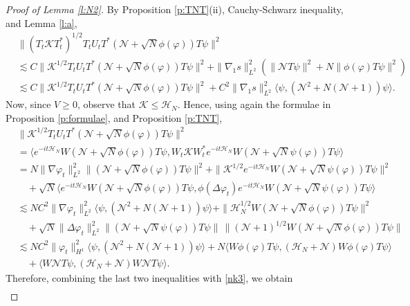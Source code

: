 \documentclass[11pt,a4paper]{scrartcl}
\newcommand{\N}{\mathcal{N}}
\newcommand{\K}{\mathcal{K}}
\begin{document}
\begin{proof}[Proof of Lemma \ref{l:N2}]
  
  By Proposition \ref{p:TNT}(ii), Cauchy-Schwarz inequality, and Lemma
  \ref{l:a},
  \begin{align*}
    & \| (T_t \K T_t^*)^{1/2} T_t U_t T^* ( \N + \sqrt{N} \phi(\varphi) ) T
    \psi \|^2 \\
    & \apprle C \| \K^{1/2} T_t U_t T^* ( \N + \sqrt{N} \phi(\varphi) ) T \psi
    \|^2 + \| \nabla_1 s \|_{L^2}^2 ( \| \N T \psi \|^2 + N \| \phi(\varphi) T
    \psi \|^2) \\
    & \apprle C \| \K^{1/2} T_t U_t T^* ( \N + \sqrt{N} \phi(\varphi) ) T \psi
    \|^2 + C^2 \| \nabla_1 s \|_{L^2}^2 \langle \psi, (\N^2 + N(\N+1)) \psi
    \rangle.
  \end{align*}
  Now, since $V \ge 0$, observe that $\K \le \mathcal{H}_N$. Hence, using
  again the formulae in Proposition \ref{p:formulae}, and Proposition
  \ref{p:TNT},
  \begin{align*}
    & \| \K^{1/2} T_t U_t T^* ( \N + \sqrt{N} \phi(\varphi) ) T \psi \|^2 \\
    & = \langle e^{-it \mathcal{H}_N} W (\N + \sqrt{N} \phi(\varphi)) T \psi,
    W_t \K W_t^* e^{-it \mathcal{H}_N} W (\N + \sqrt{N} \psi(\varphi)) T \psi
    \rangle \\
    & = N \| \nabla \varphi_t \|_{L^2}^2 \| (\N + \sqrt{N} \phi(\varphi)) T
    \psi \|^2 + \| \K^{1/2} e^{-it \mathcal{H}_N} W (\N + \sqrt{N}
    \psi(\varphi) ) T \psi \|^2 \\
    & \quad + \sqrt{N} \langle e^{-it \mathcal{H}_N} W (\N + \sqrt{N}
    \phi(\varphi)) T \psi, \phi(\Delta \varphi_t) e^{-it \mathcal{H}_N} W (\N
    + \sqrt{N} \psi(\varphi)) T \psi \rangle \\
    & \apprle N C^2 \| \nabla \varphi_t \|_{L^2}^2 \langle \psi, (\N^2 + N (\N
    + 1)) \psi \rangle + \| \mathcal{H}_{N}^{1/2} W (\N + \sqrt{N} \phi
    (\varphi) ) T \psi \|^2 \\
    & \quad + \sqrt{N} \| \Delta \varphi_t \|_{L^2}^2 \| (\N + \sqrt{N}
    \psi(\varphi) ) T \psi \| \, \| (\N+1)^{1/2} W (\N + \sqrt{N}
    \phi(\varphi) ) T \psi \| \\
    & \apprle N C^2 \| \varphi_t \|_{H^1}^2 \langle \psi, (\N^2 + N (\N + 1))
    \psi \rangle + N \langle W \phi(\varphi) T \psi, (\mathcal{H}_N + \N) W
    \phi(\varphi) T \psi \rangle \\
    & \quad + \langle W \N T \psi, (\mathcal{H}_N + \N) W \N T \psi \rangle.
  \end{align*}
  Therefore, combining the last two inequalities with \eqref{nk3}, we obtain
  \begin{align*}

\end{align*}
\end{proof}
\end{document}
